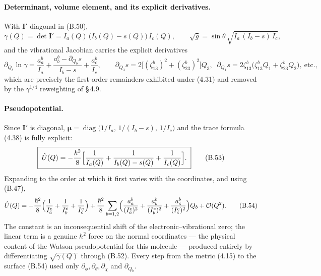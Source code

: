 \paragraph{Determinant, volume element, and its explicit derivatives.}
With $\mathbf I'$ diagonal in (B.50),
\begin{equation}
\gamma(Q)=\det\mathbf I'=I_a(Q)\,\bigl(I_b(Q)-s(Q)\bigr)\,I_c(Q),\qquad
\sqrt{g}=\sin\theta\,\sqrt{I_a\,(I_b-s)\,I_c}, \tag{B.51}
\end{equation}
and the vibrational Jacobian carries the explicit derivatives
\begin{equation}
\partial_{Q_b}\ln\gamma
=\frac{a_a^{b}}{I_a}+\frac{a_b^{b}-\partial_{Q_b}s}{I_b-s}+\frac{a_c^{b}}{I_c},
\qquad
\partial_{Q_3}s=2\bigl[(\zeta^{b}_{13})^2+(\zeta^{b}_{23})^2\bigr]Q_3,\;\;
\partial_{Q_1}s=2\zeta^{b}_{13}\bigl(\zeta^{b}_{13}Q_1+\zeta^{b}_{23}Q_2\bigr),\ \text{etc.}, \tag{B.52}
\end{equation}
which are precisely the first-order remainders exhibited under (4.31) and removed by the $\gamma^{1/4}$ reweighting of \S\,4.9.

\paragraph{Pseudopotential.}
Since $\mathbf I'$ is diagonal, $\boldsymbol\mu=\operatorname{diag}\bigl(1/I_a,\,1/(I_b-s),\,1/I_c\bigr)$ and the trace formula (4.38) is fully explicit:
\begin{equation}
\boxed{\;\hat U(Q)=-\frac{\hbar^2}{8}\Bigl[\frac{1}{I_a(Q)}+\frac{1}{I_b(Q)-s(Q)}+\frac{1}{I_c(Q)}\Bigr].\;}\tag{B.53}
\end{equation}
Expanding to the order at which it first varies with the coordinates, and using (B.47),
\begin{equation}
\hat U(Q)=-\frac{\hbar^2}{8}\Bigl(\frac{1}{I_a^{e}}+\frac{1}{I_b^{e}}+\frac{1}{I_c^{e}}\Bigr)
+\frac{\hbar^2}{8}\sum_{b=1,2}\Bigl(\frac{a_a^{b}}{(I_a^{e})^2}+\frac{a_b^{b}}{(I_b^{e})^2}+\frac{a_c^{b}}{(I_c^{e})^2}\Bigr)Q_b+\mathcal O(Q^2). \tag{B.54}
\end{equation}
The constant is an inconsequential shift of the electronic--vibrational zero; the linear term is a genuine $\hbar^2$ force on the normal coordinates --- the physical content of the Watson pseudopotential for this molecule --- produced entirely by differentiating $\sqrt{\gamma(Q)}$ through (B.52). Every step from the metric (4.15) to the surface (B.54) used only $\partial_\phi,\partial_\theta,\partial_\chi$ and $\partial_{Q_b}$.

